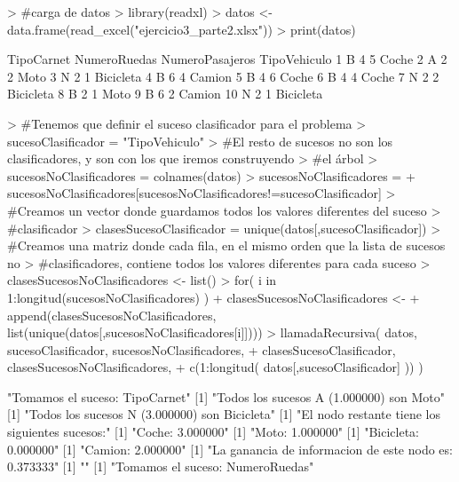 \documentclass[parskip=full]{scrartcl}
\begin{document}
\begin{Schunk}
\begin{Sinput}
> #carga de datos
> library(readxl)
> datos <- data.frame(read_excel("ejercicio3_parte2.xlsx"))
> print(datos)
\end{Sinput}
\begin{Soutput}
   TipoCarnet NumeroRuedas NumeroPasajeros TipoVehiculo
1           B            4               5        Coche
2           A            2               2         Moto
3           N            2               1    Bicicleta
4           B            6               4       Camion
5           B            4               6        Coche
6           B            4               4        Coche
7           N            2               2    Bicicleta
8           B            2               1         Moto
9           B            6               2       Camion
10          N            2               1    Bicicleta
\end{Soutput}
\begin{Sinput}
> #Tenemos que definir el suceso clasificador para el problema
> sucesoClasificador = "TipoVehiculo"
> #El resto de sucesos no son los clasificadores, y son con los que iremos construyendo 
> #el árbol
> sucesosNoClasificadores = colnames(datos)
> sucesosNoClasificadores = 
+ sucesosNoClasificadores[sucesosNoClasificadores!=sucesoClasificador]
> #Creamos un vector donde guardamos todos los valores diferentes del suceso 
> #clasificador
> clasesSucesoClasificador = unique(datos[,sucesoClasificador])
> #Creamos una matriz donde cada fila, en el mismo orden que la lista de sucesos no 
> #clasificadores, contiene todos los valores diferentes para cada suceso
> clasesSucesosNoClasificadores <- list()
> for( i in 1:longitud(sucesosNoClasificadores) )
+ { clasesSucesosNoClasificadores <- 
+ append(clasesSucesosNoClasificadores, list(unique(datos[,sucesosNoClasificadores[i]])))  }
> llamadaRecursiva( datos, sucesoClasificador, sucesosNoClasificadores, 
+ clasesSucesoClasificador, clasesSucesosNoClasificadores, 
+ c(1:longitud( datos[,sucesoClasificador] )) )
\end{Sinput}
\begin{Soutput}
[1] "Tomamos el suceso: TipoCarnet"
[1] "Todos los sucesos A (1.000000) son Moto"
[1] "Todos los sucesos N (3.000000) son Bicicleta"
[1] "El nodo restante tiene los siguientes sucesos:"
[1] "Coche: 3.000000"
[1] "Moto: 1.000000"
[1] "Bicicleta: 0.000000"
[1] "Camion: 2.000000"
[1] "La ganancia de informacion de este nodo es: 0.373333"
[1] ""
[1] "Tomamos el suceso: NumeroRuedas"

\end{Soutput}
\end{Schunk}
\end{document}

